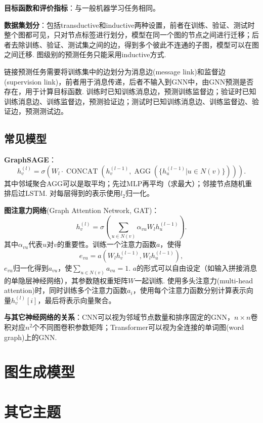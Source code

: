 \par \textbf{目标函数和评价指标}：与一般机器学习任务相同。

\par \textbf{数据集划分}：包括transductive和inductive两种设置，前者在训练、验证、测试时整个图都可见，只对节点标签进行划分，模型在同一个图的节点之间进行迁移；后者去除训练、验证、测试集之间的边，得到多个彼此不连通的子图，模型可以在图之间迁移. 图级别的预测任务只能采用inductive方式. 
\par 链接预测任务需要将训练集中的边划分为消息边(message link)和监督边(supervision link)，前者用于消息传递，后者不输入到GNN中，由GNN预测是否存在，用于计算目标函数. 训练时已知训练消息边，预测训练监督边；验证时已知训练消息边、训练监督边，预测验证边；测试时已知训练消息边、训练监督边、验证边，预测测试边。

\subsection{常见模型}
\par \textbf{GraphSAGE}：
\begin{equation}
    h_v^{(l)}=\sigma(W_l \cdot \operatorname{CONCAT}(h_v^{(l-1)},\operatorname{AGG}(\{h_u^{(l-1)}\vert u\in N(v)\}))).
\end{equation}
其中邻域聚合AGG可以是取平均；先过MLP再平均（求最大）；邻接节点随机重排后过LSTM. 对每层得到的表示使用$l_2$归一化。
\par \textbf{图注意力网络}(Graph Attention Network, GAT)：
\begin{equation}
    h_v^{(l)}=\sigma(\sum_{u\in N(v)}\alpha_{vu}W_l h_u^{(l-1)} ).
\end{equation}
其中$\alpha_{vu}$代表$u$对$v$的重要性。训练一个注意力函数$a$，使得
\begin{equation}
    e_{vu}=a(W_l h_v^{(l-1)},W_l h_u^{(l-1)}),
\end{equation}
$e_{vu}$归一化得到$a_{vu}$，使$\sum_{u\in N(v)}a_{vu}=1$. $a$的形式可以自由设定（如输入拼接消息的单隐层神经网络），其参数随权重矩阵$W$一起训练. 使用多头注意力(multi-head attention)时，同时训练多个注意力函数$a_i$，使用每个注意力函数分别计算表示向量$h_v^{(l)}[i]$，最后将表示向量聚合。

\par \textbf{与其它神经网络的关系}：CNN可以视为邻域节点数量和排序固定的GNN，$n\times n$卷积对应$n^2$个不同图卷积参数矩阵；Transformer可以视为全连接的单词图(word graph)上的GNN.


\section{图生成模型}


\section{其它主题}